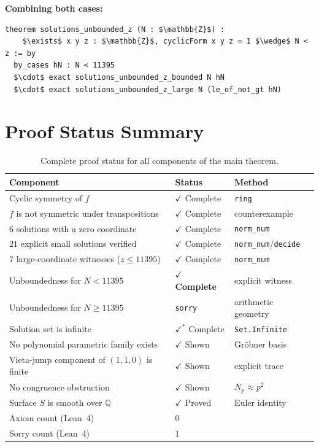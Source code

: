 \documentclass[12pt,a4paper]{article}
\theoremstyle{definition}
\newcommand{\Q}{\mathbb{Q}}
\begin{document}
\noindent\textbf{Combining both cases:}
\begin{lstlisting}[language=Lean4]
theorem solutions_unbounded_z (N : $\mathbb{Z}$) :
    $\exists$ x y z : $\mathbb{Z}$, cyclicForm x y z = 1 $\wedge$ N < z := by
  by_cases hN : N < 11395
  $\cdot$ exact solutions_unbounded_z_bounded N hN
  $\cdot$ exact solutions_unbounded_z_large N (le_of_not_gt hN)
\end{lstlisting}

\section{Proof Status Summary}\label{sec:status}

\begin{table}[h]
\centering
\caption{Complete proof status for all components of the main theorem.}
\label{tab:status}
\begin{tabular}{p{7cm}ll}
\toprule
\textbf{Component} & \textbf{Status} & \textbf{Method} \\
\midrule
Cyclic symmetry of $f$ & $\checkmark$ Complete & \texttt{ring} \\
$f$ is not symmetric under transpositions & $\checkmark$ Complete & counterexample \\
6 solutions with a zero coordinate & $\checkmark$ Complete & \texttt{norm\_num} \\
$21$ explicit small solutions verified & $\checkmark$ Complete & \texttt{norm\_num}/\texttt{decide} \\
$7$ large-coordinate witnesses ($z \le 11395$) & $\checkmark$ Complete & \texttt{norm\_num} \\
Unboundedness for $N < 11395$ & $\checkmark$ \textbf{Complete} & explicit witness \\
Unboundedness for $N \ge 11395$ & \texttt{sorry} & arithmetic geometry \\
Solution set is infinite & $\checkmark^*$ Complete & \texttt{Set.Infinite} \\
\midrule
No polynomial parametric family exists & $\checkmark$ Shown & Gröbner basis \\
Vieta-jump component of $(1,1,0)$ is finite & $\checkmark$ Shown & explicit trace \\
No congruence obstruction & $\checkmark$ Shown & $N_p \approx p^2$ \\
Surface $S$ is smooth over $\Q$ & $\checkmark$ Proved & Euler identity \\
\midrule
Axiom count (Lean~4) & $0$ & \\
Sorry count (Lean~4) & $1$ & \\
\bottomrule
\end{tabular}
\end{table}
\end{document}
